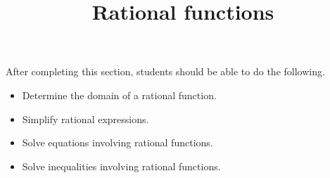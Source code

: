 \documentclass{ximera}
\title{Rational functions}
\begin{document}
\begin{abstract} 
\end{abstract}

\maketitle

\begin{sectionOutcomes}
After completing this section, students should be able to do the following.

\begin{itemize}
	\item Determine the domain of a rational function.
	\item Simplify rational expressions.
	\item Solve equations involving rational functions.
        \item Solve inequalities involving rational functions.
\end{itemize}
\end{sectionOutcomes}
\end{document}
